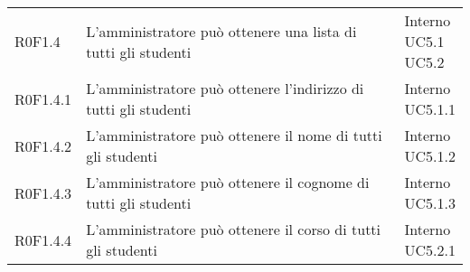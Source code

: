 \documentclass[AnalisiDeiRequisiti.tex]{subfiles}
\begin{document}
\begin{longtable}[H]{p{2cm}p{5.2cm}p{5cm}}
	R0F1.4 & L'amministratore può ottenere una lista di tutti gli studenti & \makecell[tl]{
		Interno \\
		UC5.1 \\
		UC5.2
	} \\
	R0F1.4.1 & L'amministratore può ottenere l'indirizzo di tutti gli studenti & \makecell[tl]{
		Interno \\
		UC5.1.1
	} \\
	R0F1.4.2 & L'amministratore può ottenere il nome di tutti gli studenti & \makecell[tl]{
		Interno \\
		UC5.1.2
	} \\
	R0F1.4.3 & L'amministratore può ottenere il cognome di tutti gli studenti & \makecell[tl]{
		Interno \\
		UC5.1.3
	} \\
	R0F1.4.4  & L'amministratore può ottenere il corso di tutti gli studenti & \makecell[tl]{
		Interno \\
		UC5.2.1
	} \\


\end{longtable}
\end{document}
